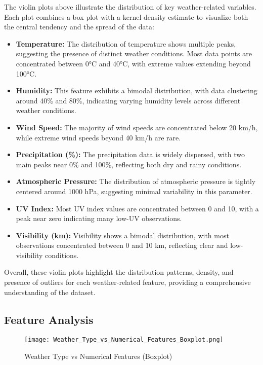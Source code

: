 \documentclass{article}
\begin{document}
The violin plots above illustrate the distribution of key weather-related variables. Each plot combines a box plot with a kernel density estimate to visualize both the central tendency and the spread of the data:

\begin{itemize}
    \item \textbf{Temperature:} The distribution of temperature shows multiple peaks, suggesting the presence of distinct weather conditions. Most data points are concentrated between 0°C and 40°C, with extreme values extending beyond 100°C.
    
    \item \textbf{Humidity:} This feature exhibits a bimodal distribution, with data clustering around 40\% and 80\%, indicating varying humidity levels across different weather conditions.
    
    \item \textbf{Wind Speed:} The majority of wind speeds are concentrated below 20 km/h, while extreme wind speeds beyond 40 km/h are rare.
    
    \item \textbf{Precipitation (\%):} The precipitation data is widely dispersed, with two main peaks near 0\% and 100\%, reflecting both dry and rainy conditions.
    
    \item \textbf{Atmospheric Pressure:} The distribution of atmospheric pressure is tightly centered around 1000 hPa, suggesting minimal variability in this parameter.
    
    \item \textbf{UV Index:} Most UV index values are concentrated between 0 and 10, with a peak near zero indicating many low-UV observations.
    
    \item \textbf{Visibility (km):} Visibility shows a bimodal distribution, with most observations concentrated between 0 and 10 km, reflecting clear and low-visibility conditions.
\end{itemize}

Overall, these violin plots highlight the distribution patterns, density, and presence of outliers for each weather-related feature, providing a comprehensive understanding of the dataset.



\subsection{Feature Analysis}
\begin{figure}[H]
    \centering
    \texttt{[image: Weather\_Type\_vs\_Numerical\_Features\_Boxplot.png]}
    \caption{Weather Type vs Numerical Features (Boxplot)}
    \label{fig:weather_type_boxplot}
\end{figure}
\end{document}
